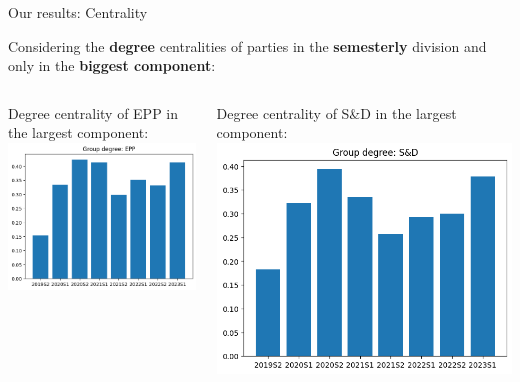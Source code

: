 \documentclass{beamer}
\begin{document}
\begin{frame}{Our results: Centrality}
	
	Considering the \textbf{degree} centralities of parties in the \textbf{semesterly} division and only in the \textbf{biggest component}:
	\vspace{4mm}
	\pause
	
\begin{columns}
	\begin{column}{0.5\textwidth}
	Degree centrality of EPP in the largest component:
	\\
	\includegraphics[width=\textwidth]{img/EPP_HY_deg.png}
	\end{column}
	
	\pause 
	\begin{column}{0.5\textwidth}
	Degree centrality of S\&D in the largest component:
	\includegraphics[width=\textwidth]{img/S&D_HY_deg.png}
	\end{column}
\end{columns}

\end{frame}
\end{document}
